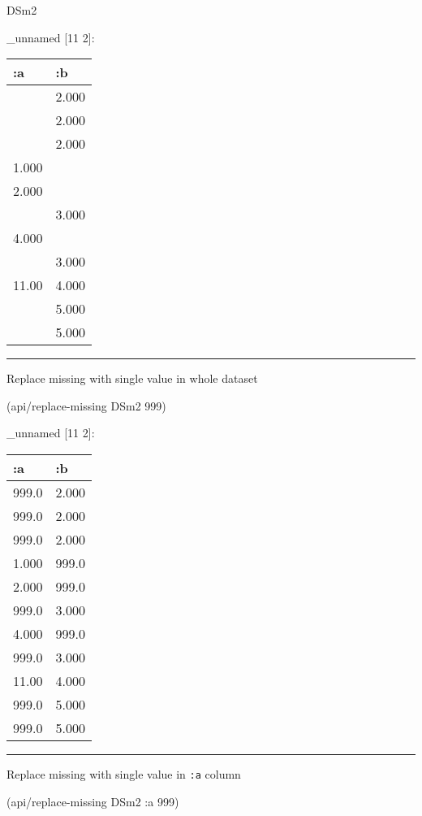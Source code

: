 \documentclass[]{article}
\newenvironment{Shaded}{\begin{snugshade}}{\end{snugshade}}
\newcommand{\DecValTok}[1]{\textcolor[rgb]{0.00,0.00,0.81}{#1}}
\newcommand{\AttributeTok}[1]{\textcolor[rgb]{0.77,0.63,0.00}{#1}}
\newcommand{\NormalTok}[1]{#1}
\begin{document}
\begin{Shaded}
\begin{Highlighting}[]
\NormalTok{DSm2}
\end{Highlighting}
\end{Shaded}

\_unnamed {[}11 2{]}:

\begin{longtable}[]{@{}ll@{}}
\toprule
:a & :b\tabularnewline
\midrule
\endhead
& 2.000\tabularnewline
& 2.000\tabularnewline
& 2.000\tabularnewline
1.000 &\tabularnewline
2.000 &\tabularnewline
& 3.000\tabularnewline
4.000 &\tabularnewline
& 3.000\tabularnewline
11.00 & 4.000\tabularnewline
& 5.000\tabularnewline
& 5.000\tabularnewline
\bottomrule
\end{longtable}

\begin{center}\rule{0.5\linewidth}{0.5pt}\end{center}

Replace missing with single value in whole dataset

\begin{Shaded}
\begin{Highlighting}[]
\NormalTok{(api/replace-missing DSm2 }\DecValTok{999}\NormalTok{)}
\end{Highlighting}
\end{Shaded}

\_unnamed {[}11 2{]}:

\begin{longtable}[]{@{}ll@{}}
\toprule
:a & :b\tabularnewline
\midrule
\endhead
999.0 & 2.000\tabularnewline
999.0 & 2.000\tabularnewline
999.0 & 2.000\tabularnewline
1.000 & 999.0\tabularnewline
2.000 & 999.0\tabularnewline
999.0 & 3.000\tabularnewline
4.000 & 999.0\tabularnewline
999.0 & 3.000\tabularnewline
11.00 & 4.000\tabularnewline
999.0 & 5.000\tabularnewline
999.0 & 5.000\tabularnewline
\bottomrule
\end{longtable}

\begin{center}\rule{0.5\linewidth}{0.5pt}\end{center}

Replace missing with single value in \texttt{:a} column

\begin{Shaded}
\begin{Highlighting}[]
\NormalTok{(api/replace-missing DSm2 }\AttributeTok{:a} \DecValTok{999}\NormalTok{)}
\end{Highlighting}
\end{Shaded}
\end{document}
